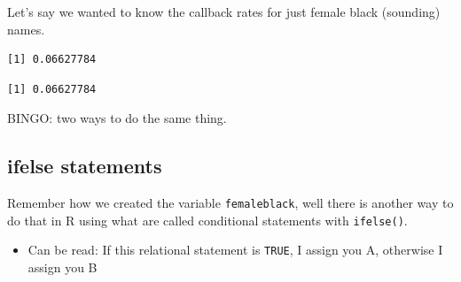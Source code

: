 \documentclass[
  letterpaper,
  DIV=11,
  numbers=noendperiod]{scrreprt}
\newenvironment{Shaded}{\begin{snugshade}}{\end{snugshade}}
\newcommand{\DecValTok}[1]{\textcolor[rgb]{0.68,0.00,0.00}{#1}}
\newcommand{\FunctionTok}[1]{\textcolor[rgb]{0.28,0.35,0.67}{#1}}
\newcommand{\NormalTok}[1]{\textcolor[rgb]{0.00,0.23,0.31}{#1}}
\newcommand{\OtherTok}[1]{\textcolor[rgb]{0.00,0.23,0.31}{#1}}
\newcommand{\SpecialCharTok}[1]{\textcolor[rgb]{0.37,0.37,0.37}{#1}}
\newcommand{\StringTok}[1]{\textcolor[rgb]{0.13,0.47,0.30}{#1}}
\providecommand{\tightlist}{%
  \setlength{\itemsep}{0pt}\setlength{\parskip}{0pt}}\usepackage{longtable,booktabs,array}
\begin{document}
Let's say we wanted to know the callback rates for just female black
(sounding) names.

\begin{Shaded}
\end{Shaded}

\begin{verbatim}
[1] 0.06627784
\end{verbatim}

\begin{Shaded}
\end{Shaded}

\begin{verbatim}
[1] 0.06627784
\end{verbatim}

BINGO: two ways to do the same thing.

\hypertarget{ifelse-statements}{%
\subsection{ifelse statements}\label{ifelse-statements}}

Remember how we created the variable \texttt{femaleblack}, well there is
another way to do that in R using what are called conditional statements
with \texttt{ifelse()}.

\begin{itemize}
\tightlist
\item
  Can be read: If this relational statement is \texttt{TRUE}, I assign
  you A, otherwise I assign you B
\end{itemize}

\begin{Shaded}
\end{Shaded}
\end{document}
